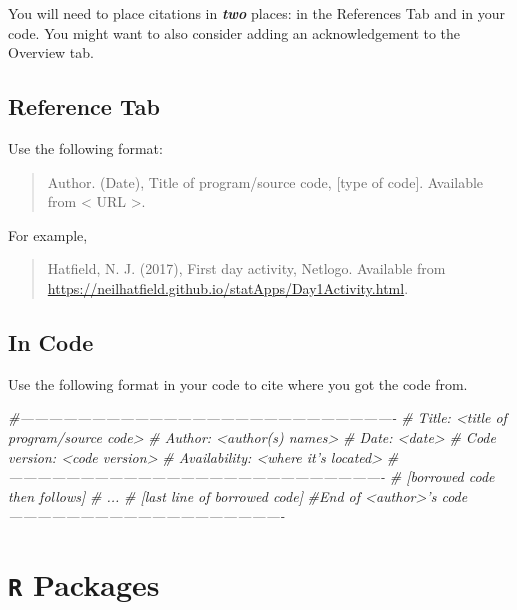 \documentclass[
]{book}
\newenvironment{Shaded}{\begin{snugshade}}{\end{snugshade}}
\newcommand{\CommentTok}[1]{\textcolor[rgb]{0.56,0.35,0.01}{\textit{#1}}}
\begin{document}
You will need to place citations in \emph{\textbf{two}} places: in the References Tab and in your code. You might want to also consider adding an acknowledgement to the Overview tab.

\hypertarget{reference-tab}{%
\subsection{Reference Tab}\label{reference-tab}}

Use the following format:

\begin{quote}
Author. (Date), Title of program/source code, {[}type of code{]}. Available from \textless{} URL \textgreater.
\end{quote}

For example,

\begin{quote}
Hatfield, N. J. (2017), First day activity, Netlogo. Available from \url{https://neilhatfield.github.io/statApps/Day1Activity.html}.
\end{quote}

\hypertarget{in-code}{%
\subsection{In Code}\label{in-code}}

Use the following format in your code to cite where you got the code from.

\begin{Shaded}
\begin{Highlighting}[]
\CommentTok{#-------------------------------------------------------------------------------}
\CommentTok{#  Title: <title of program/source code>}
\CommentTok{#  Author: <author(s) names>}
\CommentTok{#  Date: <date>}
\CommentTok{#  Code version: <code version>}
\CommentTok{#  Availability: <where it's located>}
\CommentTok{#-------------------------------------------------------------------------------}
\CommentTok{# [borrowed code then follows]}
\CommentTok{# ...}
\CommentTok{# [last line of borrowed code]      }
\CommentTok{#End of <author>'s code----------------------------------------------------------}
\end{Highlighting}
\end{Shaded}

\hypertarget{r-packages}{%
\section{\texorpdfstring{\texttt{R} Packages}{R Packages}}\label{r-packages}}
\end{document}
